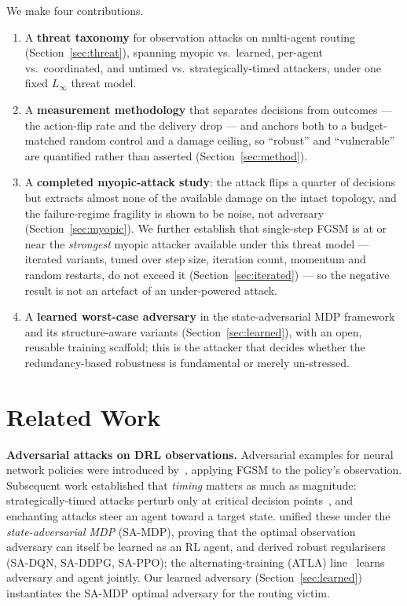 \documentclass[10pt,journal,comsoc]{IEEEtran}
\begin{document}
We make four contributions.
\begin{enumerate}
  \item A \textbf{threat taxonomy} for observation attacks on multi-agent routing
  (Section~\ref{sec:threat}), spanning myopic vs.\ learned, per-agent vs.\ coordinated,
  and untimed vs.\ strategically-timed attackers, under one fixed $L_\infty$ threat
  model.
  \item A \textbf{measurement methodology} that separates decisions from outcomes ---
  the action-flip rate and the delivery drop --- and anchors both to a budget-matched
  random control and a damage ceiling, so ``robust'' and ``vulnerable'' are quantified
  rather than asserted (Section~\ref{sec:method}).
  \item A \textbf{completed myopic-attack study}: the attack flips a quarter of
  decisions but extracts almost none of the available damage on the intact topology,
  and the failure-regime fragility is shown to be noise, not adversary
  (Section~\ref{sec:myopic}). We further establish that single-step FGSM is at or near
  the \emph{strongest} myopic attacker available under this threat model --- iterated
  variants, tuned over step size, iteration count, momentum and random restarts, do not
  exceed it (Section~\ref{sec:iterated}) --- so the negative result is not an artefact
  of an under-powered attack.
  \item A \textbf{learned worst-case adversary} in the state-adversarial MDP framework
  and its structure-aware variants (Section~\ref{sec:learned}), with an open, reusable
  training scaffold; this is the attacker that decides whether the redundancy-based
  robustness is fundamental or merely un-stressed.
\end{enumerate}

\section{Related Work}
\label{sec:related}
\textbf{Adversarial attacks on DRL observations.} Adversarial examples for neural
network policies were introduced by~\cite{huang2017adversarial}, applying FGSM to the
policy's observation. Subsequent work established that \emph{timing} matters as much as
magnitude: strategically-timed attacks perturb only at critical decision
points~\cite{lin2017tactics,sun2020stealthy}, and enchanting attacks steer an agent
toward a target state. \cite{zhang2020robust} unified these under the
\emph{state-adversarial MDP} (SA-MDP), proving that the optimal observation adversary
can itself be learned as an RL agent, and derived robust regularisers (SA-DQN,
SA-DDPG, SA-PPO); the alternating-training (ATLA) line~\cite{zhang2021robust} learns
adversary and agent jointly. Our learned adversary (Section~\ref{sec:learned})
instantiates the SA-MDP optimal adversary for the routing victim.
\end{document}
